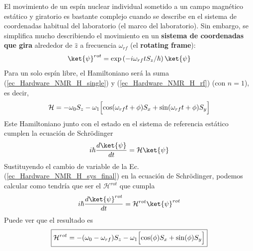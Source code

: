 \documentclass[a4paper,11pt]{book} %
\newtheorem{ejercicio_contador}{Ejercicio}
\newcommand{\Ejercicio}[1]{
		\begin{mybox_gray}{Ejercicio} 
			\begin{ejercicio_contador}
				 #1 
			\end{ejercicio_contador} 
		\end{mybox_gray}
	}
\numberwithin{equation}{chapter}
\def\lp{\left(}
\def\rp{\right)}
\def\Lc{\Bigl[}
\def\Rc{\Bigr]}
\begin{document}
El movimiento de un espín nuclear individual sometido a un campo magnético estático y giratorio es bastante complejo cuando se describe en el sistema de coordenadas habitual del laboratorio (el marco del laboratorio). Sin embargo, se simplifica mucho describiendo el movimiento en un \textbf{sistema de coordenadas que gira} alrededor de $\hat{z}$ a frecuencia $\omega_{rf}$ (el \textbf{rotating frame}):
	\begin{equation} \label{ec_Hardware_NMR_psi_rot}
	\ket{\psi}^{rot} = \exp \lp -i \omega_{rf} t S_z/\hbar \rp \ket{\psi}
	\end{equation}
Para un solo espín libre, el Hamiltoniano será la suma (\ref{ec_Hardware_NMR_H_single}) y (\ref{ec_Hardware_NMR_H_rf}) (con $n=1$), es decir,
	\begin{equation} \label{ec_Hardware_NMR_H_lab_single}
	\mathcal{H} = - \omega_0 S_z - \omega_1 \Lc \cos (\omega_{rf} t+ \phi) S_x + \sin (\omega_{rf} t + \phi) S_y \Rc
	\end{equation}
Este Hamiltoniano junto con el estado en el sistema de referencia estático cumplen la ecuación de Schrödinger
	\begin{equation}
	i \hbar \frac{d \ket{\psi}}{dt} = \mathcal{H} \ket{\psi}
	\end{equation}
Sustituyendo el cambio de variable de la Ec. (\ref{ec_Hardware_NMR_H_sys_final}) en la ecuación de Schrödinger, podemos calcular como tendría que ser el $\mathcal{H}^{rot}$ que cumpla
	\begin{equation}
	i \hbar \frac{d \ket{\psi}^{rot}}{dt} = \mathcal{H}^{rot} \ket{\psi}^{rot}
	\end{equation}
Puede ver que el resultado es
	\begin{equation} \label{ec_Hardware_NMR_H_rot_single}
	\boxed{\mathcal{H}^{rot} = - (\omega_0 - \omega_{rf}) S_z - \omega_1 \Lc \cos (\phi) S_x + \sin  (\phi) S_y \Rc}
	\end{equation}

\end{document}

